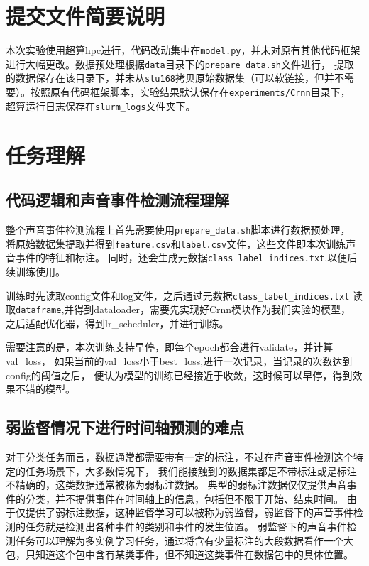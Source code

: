 \documentclass[]{ctexart}
\begin{document}
\section{提交文件简要说明}
本次实验使用超算hpc进行，代码改动集中在\texttt{model.py}，并未对原有其他代码框架进行大幅更改。数据预处理根据\texttt{data}目录下的\texttt{prepare\_data.sh}文件进行，
提取的数据保存在该目录下，并未从\texttt{stu168}拷贝原始数据集（可以软链接，但并不需要）。按照原有代码框架脚本，实验结果默认保存在\texttt{experiments/Crnn}目录下，
超算运行日志保存在\texttt{slurm\_logs}文件夹下。
\section{任务理解}

\subsection{代码逻辑和声音事件检测流程理解}
整个声音事件检测流程上首先需要使用\texttt{prepare\_data.sh}脚本进行数据预处理，
将原始数据集提取并得到\texttt{feature.csv}和\texttt{label.csv}文件，这些文件即本次训练声音事件的特征和标注。
同时，还会生成元数据\texttt{class\_label\_indices.txt},以便后续训练使用。

训练时先读取config文件和log文件，之后通过元数据\texttt{class\_label\_indices.txt}
读取\texttt{dataframe},并得到dataloader，需要先实现好Crnn模块作为我们实验的模型，
之后适配优化器，得到lr\_scheduler，并进行训练。

需要注意的是，本次训练支持早停，即每个epoch都会进行validate，并计算val\_loss，
如果当前的val\_loss小于best\_loss,进行一次记录，当记录的次数达到config的阈值之后，
便认为模型的训练已经接近于收敛，这时候可以早停，得到效果不错的模型。

\subsection{弱监督情况下进行时间轴预测的难点}
对于分类任务而言，数据通常都需要带有一定的标注，不过在声音事件检测这个特定的任务场景下，大多数情况下，
我们能接触到的数据集都是不带标注或是标注不精确的，这类数据通常被称为弱标注数据。
典型的弱标注数据仅仅提供声音事件的分类，并不提供事件在时间轴上的信息，包括但不限于开始、结束时间。
由于仅提供了弱标注数据，这种监督学习可以被称为弱监督，弱监督下的声音事件检测的任务就是检测出各种事件的类别和事件的发生位置。
弱监督下的声音事件检测任务可以理解为多实例学习任务，通过将含有少量标注的大段数据看作一个大包，只知道这个包中含有某类事件，但不知道这类事件在数据包中的具体位置。
\end{document}
